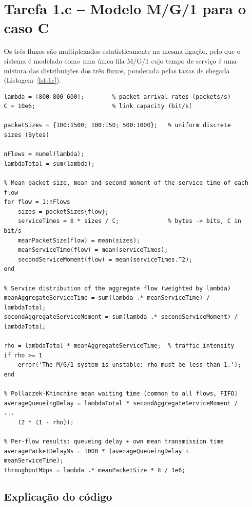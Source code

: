 \documentclass[11pt,a4paper]{article}
\begin{document}
\newpage

\section{Tarefa 1.c -- Modelo M/G/1 para o caso C}

Os três fluxos são multiplexados estatisticamente na mesma ligação, pelo que o
sistema é modelado como uma única fila M/G/1 cujo tempo de serviço é uma
mistura das distribuições dos três fluxos, ponderada pelas taxas de chegada
(Listagem~\ref{lst:1c}).

\begin{lstlisting}[caption={Determinação dos valores teóricos do caso C (M/G/1).},
                   label={lst:1c},
                   basicstyle=\ttfamily\scriptsize]
lambda = [800 800 600];        % packet arrival rates (packets/s)
C = 10e6;                      % link capacity (bit/s)

packetSizes = {100:1500; 100:150; 500:1000};   % uniform discrete sizes (Bytes)

nFlows = numel(lambda);
lambdaTotal = sum(lambda);

% Mean packet size, mean and second moment of the service time of each flow
for flow = 1:nFlows
    sizes = packetSizes{flow};
    serviceTimes = 8 * sizes / C;              % bytes -> bits, C in bit/s
    meanPacketSize(flow) = mean(sizes);
    meanServiceTime(flow) = mean(serviceTimes);
    secondServiceMoment(flow) = mean(serviceTimes.^2);
end

% Service distribution of the aggregate flow (weighted by lambda)
meanAggregateServiceTime = sum(lambda .* meanServiceTime) / lambdaTotal;
secondAggregateServiceMoment = sum(lambda .* secondServiceMoment) / lambdaTotal;

rho = lambdaTotal * meanAggregateServiceTime;  % traffic intensity
if rho >= 1
    error('The M/G/1 system is unstable: rho must be less than 1.');
end

% Pollaczek-Khinchine mean waiting time (common to all flows, FIFO)
averageQueueingDelay = lambdaTotal * secondAggregateServiceMoment / ...
    (2 * (1 - rho));

% Per-flow results: queueing delay + own mean transmission time
averagePacketDelayMs = 1000 * (averageQueueingDelay + meanServiceTime);
throughputMbps = lambda .* meanPacketSize * 8 / 1e6;
\end{lstlisting}

\subsection*{Explicação do código}
\end{document}
